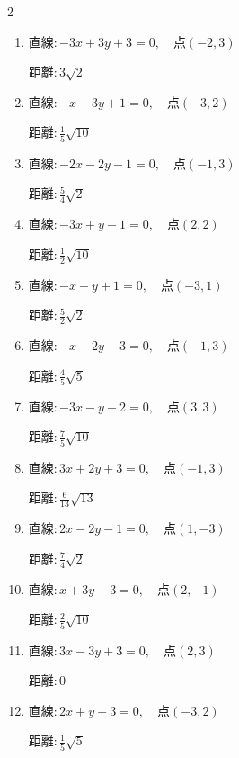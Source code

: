 \begin{multicols}{2}
\begin{enumerate}
\resetques

  \item $直線:-3x+3y+3=0,\quad 点 ( -2, 3 )$

        $\displaystyle 距離 : 3\sqrt{2}$

  \item $直線:-x-3y+1=0,\quad 点 ( -3, 2 )$

        $\displaystyle 距離 : \frac{1}{5}\sqrt{10}$

  \item $直線:-2x-2y-1=0,\quad 点 ( -1, 3 )$

        $\displaystyle 距離 : \frac{5}{4}\sqrt{2}$

  \item $直線:-3x+y-1=0,\quad 点 ( 2, 2 )$

        $\displaystyle 距離 : \frac{1}{2}\sqrt{10}$

  \item $直線:-x+y+1=0,\quad 点 ( -3, 1 )$

        $\displaystyle 距離 : \frac{5}{2}\sqrt{2}$

  \item $直線:-x+2y-3=0,\quad 点 ( -1, 3 )$

        $\displaystyle 距離 : \frac{4}{5}\sqrt{5}$

  \item $直線:-3x-y-2=0,\quad 点 ( 3, 3 )$

        $\displaystyle 距離 : \frac{7}{5}\sqrt{10}$

  \item $直線:3x+2y+3=0,\quad 点 ( -1, 3 )$

        $\displaystyle 距離 : \frac{6}{13}\sqrt{13}$

  \item $直線:2x-2y-1=0,\quad 点 ( 1, -3 )$

        $\displaystyle 距離 : \frac{7}{4}\sqrt{2}$

  \item $直線:x+3y-3=0,\quad 点 ( 2, -1 )$

        $\displaystyle 距離 : \frac{2}{5}\sqrt{10}$

\columnbreak %

  \item $直線:3x-3y+3=0,\quad 点 ( 2, 3 )$

        $\displaystyle 距離 : 0$

  \item $直線:2x+y+3=0,\quad 点 ( -3, 2 )$

        $\displaystyle 距離 : \frac{1}{5}\sqrt{5}$


\end{enumerate}
\end{multicols}
